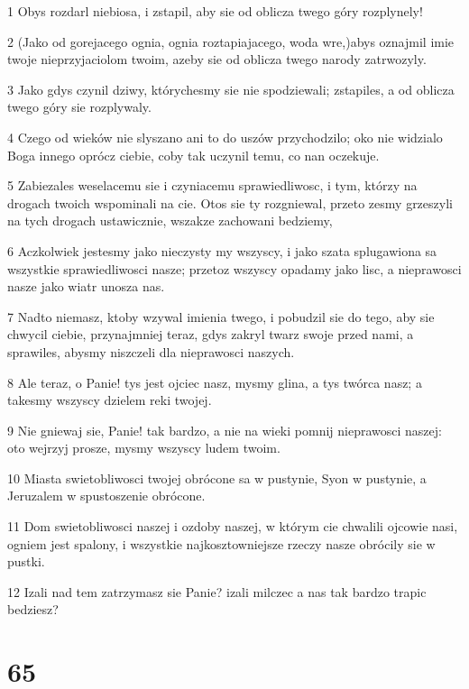 \par 1 Obys rozdarl niebiosa, i zstapil, aby sie od oblicza twego góry rozplynely!
\par 2 (Jako od gorejacego ognia, ognia roztapiajacego, woda wre,)abys oznajmil imie twoje nieprzyjaciolom twoim, azeby sie od oblicza twego narody zatrwozyly.
\par 3 Jako gdys czynil dziwy, którychesmy sie nie spodziewali; zstapiles, a od oblicza twego góry sie rozplywaly.
\par 4 Czego od wieków nie slyszano ani to do uszów przychodzilo; oko nie widzialo Boga innego oprócz ciebie, coby tak uczynil temu, co nan oczekuje.
\par 5 Zabiezales weselacemu sie i czyniacemu sprawiedliwosc, i tym, którzy na drogach twoich wspominali na cie. Otos sie ty rozgniewal, przeto zesmy grzeszyli na tych drogach ustawicznie, wszakze zachowani bedziemy,
\par 6 Aczkolwiek jestesmy jako nieczysty my wszyscy, i jako szata splugawiona sa wszystkie sprawiedliwosci nasze; przetoz wszyscy opadamy jako lisc, a nieprawosci nasze jako wiatr unosza nas.
\par 7 Nadto niemasz, ktoby wzywal imienia twego, i pobudzil sie do tego, aby sie chwycil ciebie, przynajmniej teraz, gdys zakryl twarz swoje przed nami, a sprawiles, abysmy niszczeli dla nieprawosci naszych.
\par 8 Ale teraz, o Panie! tys jest ojciec nasz, mysmy glina, a tys twórca nasz; a takesmy wszyscy dzielem reki twojej.
\par 9 Nie gniewaj sie, Panie! tak bardzo, a nie na wieki pomnij nieprawosci naszej: oto wejrzyj prosze, mysmy wszyscy ludem twoim.
\par 10 Miasta swietobliwosci twojej obrócone sa w pustynie, Syon w pustynie, a Jeruzalem w spustoszenie obrócone.
\par 11 Dom swietobliwosci naszej i ozdoby naszej, w którym cie chwalili ojcowie nasi, ogniem jest spalony, i wszystkie najkosztowniejsze rzeczy nasze obrócily sie w pustki.
\par 12 Izali nad tem zatrzymasz sie Panie? izali milczec a nas tak bardzo trapic bedziesz?

\chapter{65}

